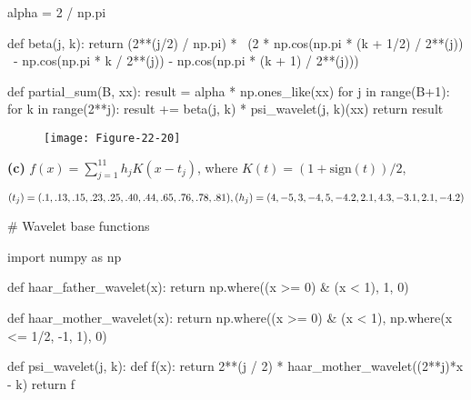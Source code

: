 \begin{python}
alpha = 2 / np.pi

def beta(j, k):
    return (2**(j/2) / np.pi) *  \
            (2 * np.cos(np.pi * (k + 1/2) / 2**(j)) \
            - np.cos(np.pi * k / 2**(j)) - np.cos(np.pi * (k + 1) / 2**(j)))

def partial_sum(B, xx):
    result = alpha * np.ones_like(xx)
    for j in range(B+1):
        for k in range(2**j):
            result += beta(j, k) * psi_wavelet(j, k)(xx)
    return result
\end{python}


\begin{figure}[H]
\centering
\texttt{[image: Figure-22-20]}
\end{figure}

\textbf{(c)} \(f(x) = \sum_{j=1}^{11} h_{j} K(x - t_{j})\), where
\(K(t) = (1 + \text{sign}(t)) / 2\),

\[ 
(t_{j}) = (.1, .13, .15, .23, .25, .40, .44, .65, .76, .78, .81), \\
(h_{j}) = (4, -5, 3, -4, 5, -4.2, 2.1, 4.3, -3.1, 2.1, -4.2)
\]

\begin{python}
# Wavelet base functions

import numpy as np

def haar_father_wavelet(x):
    return np.where((x >= 0) & (x < 1), 1, 0)

def haar_mother_wavelet(x):
    return np.where((x >= 0) & (x < 1), np.where(x <= 1/2, -1, 1), 0)

def psi_wavelet(j, k):
    def f(x):
        return 2**(j / 2) * haar_mother_wavelet((2**j)*x - k)
    return f
\end{python}

